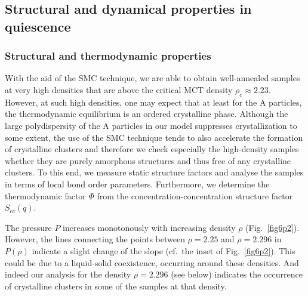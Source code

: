 
\subsection{Structural and dynamical properties in quiescence}
%
\subsubsection{Structural and thermodynamic properties}
%
With the aid of the SMC technique, we are able to obtain well-annealed samples at very high densities that are above the critical MCT density \cite{horbach2009} $\rho_c \approx 2.23$. However, at such high densities, one may expect that at least for the A particles, the thermodynamic equilibrium is an ordered crystalline phase. Although the large polydispersity of the A particles in our model suppresses crystallization to some extent, the use of the SMC technique tends to also accelerate the formation of crystalline clusters and therefore we check especially the high-density samples whether they are purely amorphous structures and thus free of any crystalline clusters. To this end, we measure static structure factors and analyse the samples in terms of local bond order parameters.  Furthermore, we determine the thermodynamic factor $\Phi$ from the concentration-concentration structure factor $S_{cc}(q)$.

The pressure $P$ increases monotonously with increasing density $\rho$ (Fig.~\ref{fig6p2}).  However, the lines connecting the points between $\rho = 2.25$ and $\rho = 2.296$ in $P(\rho)$ indicate a slight change of the slope (cf.~the inset of Fig.~\ref{fig6p2}). This could be due to a liquid-solid coexistence, occurring around these densities.  And indeed our analysis for the density $\rho = 2.296$ (see below) indicates the occurrence of crystalline clusters in some of the samples at that density.

